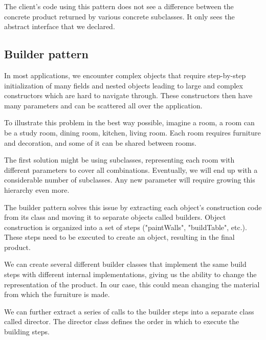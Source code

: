 The client's code using this pattern does not see a difference between the concrete product returned by various concrete subclasses.
It only sees the abstract interface that we declared.

\subsection{Builder pattern}

In most applications, we encounter complex objects that require step-by-step initialization of many fields and nested objects leading to large and complex constructors which are hard to navigate through. These constructors then have many parameters and can be scattered all over the application.

To illustrate this problem in the best way possible, imagine a room, a room can be a study room, dining room, kitchen, living room. Each room requires furniture and decoration, and some of it can be shared between rooms.

The first solution might be using subclasses, representing each room with different parameters to cover all combinations. Eventually, we will end up with a considerable number of subclasses. Any new parameter will require growing this hierarchy even more.

The builder pattern solves this issue by extracting each object's construction code from its class and moving it to separate objects called builders. Object construction is organized into a set of steps ("paintWalls", "buildTable", etc.). These steps need to be executed to create an object, resulting in the final product.

We can create several different builder classes that implement the same build steps with different internal implementations, giving us the ability to change the representation of the product. In our case, this could mean changing the material from which the furniture is made.

We can further extract a series of calls to the builder steps into a separate class called director. The director class defines the order in which to execute the building steps. \cite{noauthor_factory_nodate}
